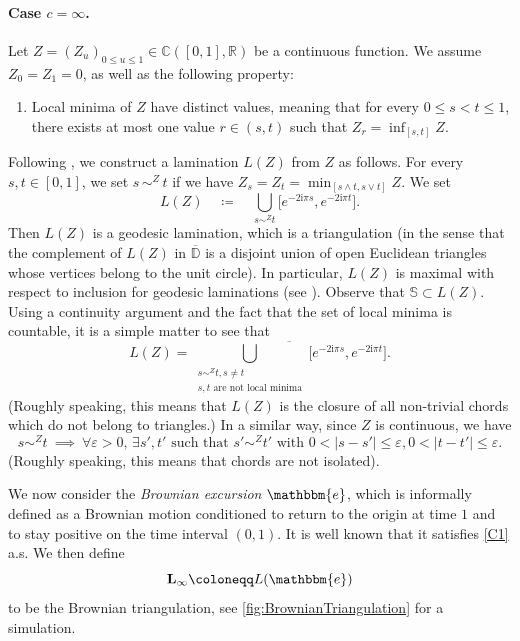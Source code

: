 \documentclass[AHL,XML,longabstracts,Unicode]{cedram}
\newcommand{\R}{\mathbb{R}}
\def\S{\mathbb{S}}
\renewcommand{\epsilon}{\varepsilon}
\begin{document}
\paragraph*{Case $c=\infty$.}  Let $Z=(Z_{u})_{0 \leq u \leq 1} \in \mathbb{C}([0,1],\R)$ be a continuous function.
We assume \hbox{$Z_{0}=Z_{1}=0$}, as well as the following property:
\begin{enumerate}[label=\color{blue}(C\arabic*)]
\item\label{C1} Local minima of $Z$ have distinct values,
  meaning that for every $0 \le s < t \le 1$, there exists at most one value $r \in (s, t)$ such that $Z_{r} = \inf_{[s, t]} Z$.
\end{enumerate}
Following \cite{Ald94a,LGP08}, we construct a lamination $L(Z)$ from $Z$ as follows.
For
every $s,t \in [0,1]$, we set $s \, {\sim}^{Z}\,  t$ if we have $Z_{s}
=Z_{t} = \min_{[s\wedge t, s \vee t]} Z$. We  set
 \begin{equation}
 \label{eq:defbl}
L(Z) \quad \coloneqq \quad  \bigcup_{s \sim^{Z} t} \big[e^{-2\textrm{i} \pi s},e^{-2\textrm{i} \pi t}\big].
 \end{equation}
 Then $L(Z) $ is a geodesic lamination, which is a triangulation (in the sense that the
complement of $ L(Z) $ in $\overline{ \mathbb{D}}$ is a
disjoint union of open Euclidean triangles whose vertices belong to
the unit circle).  In particular,  $L(Z) $ is maximal with respect to inclusion for geodesic laminations (see \cite[Proposition 2.1]{LGP08}). Observe that $\S \subset  L(Z)$.
Using a continuity argument and the fact that the set of local minima is countable, it is a simple matter to see that
 \begin{equation}
 \label{eq:adherence}
 L(Z)= \overline{ \bigcup_{\substack{s \sim^{Z} t, s \neq t\\ s,t \textrm{ are not local minima}}} \big[e^{-2\textrm{i} \pi s},e^{-2\textrm{i} \pi t}\big]}.
 \end{equation}
 (Roughly speaking, this means that $ L(Z)$ is the closure of all non-trivial chords which do not belong to triangles.)
 In a similar way, since $Z$ is continuous, we have
  \begin{equation}
 \label{eq:isolated} s \sim^{Z} t \ \implies \  \forall \epsilon>0,\, \exists s',t' \textrm{ such that }  s' \sim^{Z} t'  \textrm{ with } 0<|s-s'| \leq \epsilon, 0<|t-t'| \leq \epsilon.
  \end{equation}
 (Roughly speaking, this means that  chords are not isolated).

 We now consider the {\em Brownian excursion} $\mathbbm{e}$,
 which is informally defined as a Brownian motion
 conditioned to return to the origin at time $1$ and to stay positive on the time interval $(0,1)$.
 It is well known that it satisfies \ref{C1}
 a.s.  We then define
 \[\mathbf{L}_{\infty} \coloneqq L(\mathbbm{e})\]
 to be the Brownian triangulation, see \cref{fig:BrownianTriangulation} for a simulation.
\end{document}
